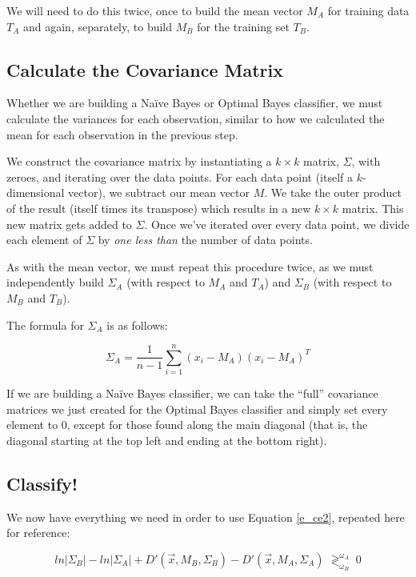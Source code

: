 \documentclass{article}
\begin{document}
We will need to do this twice, once to build the mean vector $M_A$ for training
data $T_A$ and again, separately, to build $M_B$ for the training set $T_B$.

\subsection{Calculate the Covariance Matrix}

Whether we are building a Na\"ive Bayes or Optimal Bayes classifier, we must
calculate the variances for each observation, similar to how we calculated
the mean for each observation in the previous step.

We construct the covariance matrix by instantiating a $k \times k$ matrix,
$\Sigma$, with zeroes, and iterating over the data points.  For each data point
(itself a $k$-dimensional vector), we subtract our mean vector $M$. We take the
outer product of the result (itself times its transpose) which results in a
new $k \times k$ matrix. This new matrix gets added to $\Sigma$. Once we've
iterated over every data point, we divide each element of $\Sigma$ by
\emph{one less than} the number of data points.

As with the mean vector, we must repeat this procedure twice, as we must
independently build $\Sigma_A$ (with respect to $M_A$ and
$T_A$) and $\Sigma_B$ (with respect to $M_B$ and $T_B$).

The formula for $\Sigma_A$ is as follows:

\[ \Sigma_A = \frac{1}{n-1} \sum_{i=1}^{n} (x_i - M_A)(x_i - M_A)^{T}
\]

If we are building a Na\"ive Bayes classifier, we can take the ``full''
covariance matrices we just created for the Optimal Bayes classifier and simply
set every element to $0$, except for those found along the main diagonal (that
is, the diagonal starting at the top left and ending at the bottom right).

\subsection{Classify!}

We now have everything we need in order to use Equation \ref{e_ce2}, repeated
here for reference:

\begin{equation*}
ln|\Sigma_B| - ln|\Sigma_A| + D'(\vec{x},M_B,\Sigma_B) - D'(\vec{x},M_A,\Sigma_A)
\; \gtrless^{\omega_A}_{\omega_B} \; 0 
\end{equation*}
\end{document}
